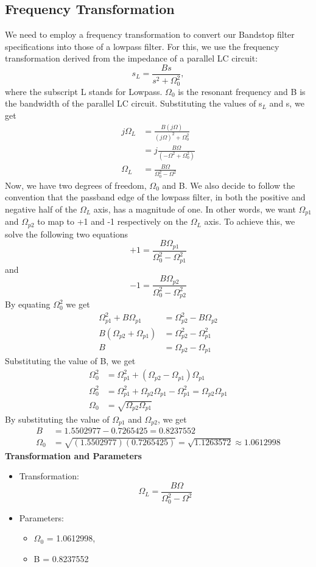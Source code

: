 \documentclass[12pt]{article}
\begin{document}
\subsection{Frequency Transformation}
We need to employ a frequency transformation to convert our Bandstop filter specifications into those of a lowpass filter. For this, we use the frequency transformation derived from the impedance of a parallel LC circuit:
\[s_L = \frac{Bs}{s^2 + \Omega_0^2},\]
where the subscript L stands for Lowpass. $\Omega_0$ is the resonant frequency and B is the bandwidth of the parallel LC circuit. Substituting the values of s$_L$ and s, we get
\begin{align*}
    j\Omega_L &= \frac{B(j\Omega)}{(j\Omega)^2 + \Omega_0^2}\\
    &= j\frac{B\Omega}{(-\Omega^2 + \Omega_0^2)}\\
    \Omega_L &= \frac{B\Omega}{\Omega_0^2 - \Omega^2}
\end{align*}
Now, we have two degrees of freedom, $\Omega_0$ and B. We also decide to follow the convention that the passband edge of the lowpass filter, in both the positive and negative half of the $\Omega_L$ axis, has a magnitude of one. In other words, we want $\Omega_{p1}$ and $\Omega_{p2}$ to map to +1 and -1 respectively on the $\Omega_L$ axis. To achieve this, we solve the following two equations
\[+1 = \frac{B\Omega_{p1}}{\Omega_0^2 - \Omega_{p1}^2}\]
and
\[-1 = \frac{B\Omega_{p2}}{\Omega_0^2 - \Omega_{p2}^2}\]
By equating $\Omega_0^2$ we get
\begin{align*}
    \Omega_{p1}^2 + B\Omega_{p1} &= \Omega_{p2}^2 - B\Omega_{p2}\\
    B(\Omega_{p2} + \Omega_{p1}) &= \Omega_{p2}^2 - \Omega_{p1}^2\\
    B &= \Omega_{p2} - \Omega_{p1}
\end{align*}
Substituting the value of B, we get
\begin{align*}
    \Omega_0^2 &= \Omega_{p1}^2 + (\Omega_{p2} - \Omega_{p1})\Omega_{p1}\\
    \Omega_0^2 &= \Omega_{p1}^2 + \Omega_{p2}\Omega_{p1} - \Omega_{p1}^2 = \Omega_{p2}\Omega_{p1}\\
    \Omega_0 &= \sqrt{\Omega_{p2}\Omega_{p1}}
\end{align*}
By substituting the value of $\Omega_{p1}$ and $\Omega_{p2}$, we get
\begin{align*}
    B &= 1.5502977 - 0.7265425 = 0.8237552\\
    \Omega_0 &= \sqrt{(1.5502977)(0.7265425)} = \sqrt{1.1263572} \approx 1.0612998
\end{align*}
\hline
\vspace{10pt}
\textbf{Transformation and Parameters}
\begin{itemize}
    \item Transformation:\[\Omega_L = \frac{B\Omega}{\Omega_0^2 - \Omega^2}\]
    \item Parameters:
    \begin{itemize}
        \item $\Omega_0$ = 1.0612998,
        \item B = 0.8237552
    \end{itemize}
\end{itemize}
\hline
\newpage
\end{document}
